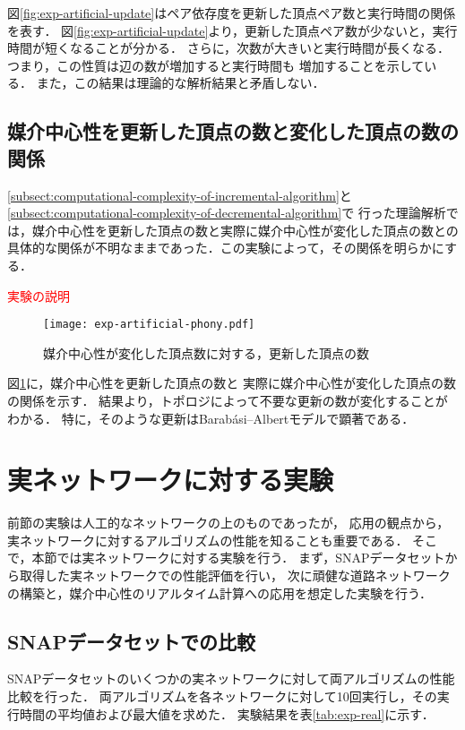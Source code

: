 図\ref{fig:exp-artificial-update}はペア依存度を更新した頂点ペア数と実行時間の関係を表す．
図\ref{fig:exp-artificial-update}より，更新した頂点ペア数が少ないと，実行時間が短くなることが分かる．
さらに，次数が大きいと実行時間が長くなる．つまり，この性質は辺の数が増加すると実行時間も
増加することを示している．
また，この結果は理論的な解析結果と矛盾しない．

\subsection{媒介中心性を更新した頂点の数と変化した頂点の数の関係}
\ref{subsect:computational-complexity-of-incremental-algorithm}と
\ref{subsect:computational-complexity-of-decremental-algorithm}で
行った理論解析では，媒介中心性を更新した頂点の数と実際に媒介中心性が変化した頂点の数との
具体的な関係が不明なままであった．この実験によって，その関係を明らかにする．

\textcolor{red}{実験の説明}

\begin{figure}[tb]
  \centering
  \texttt{[image: exp-artificial-phony.pdf]}
  \caption{媒介中心性が変化した頂点数に対する，更新した頂点の数}
  \label{fig:exp-artificial-phony}
\end{figure}

図\ref{fig:exp-artificial-phony}に，媒介中心性を更新した頂点の数と
実際に媒介中心性が変化した頂点の数の関係を示す．
結果より，トポロジによって不要な更新の数が変化することがわかる．
特に，そのような更新はBarab\'{a}si--Albertモデルで顕著である．

\section{実ネットワークに対する実験}
\label{sect:exp-realnet}
前節の実験は人工的なネットワークの上のものであったが，
応用の観点から，実ネットワークに対するアルゴリズムの性能を知ることも重要である．
そこで，本節では実ネットワークに対する実験を行う．
まず，SNAPデータセット\cite{Leskovec2016}から取得した実ネットワークでの性能評価を行い，
次に頑健な道路ネットワークの構築と，媒介中心性のリアルタイム計算への応用を想定した実験を行う．

\subsection{SNAPデータセットでの比較}
\label{subsect:exp-real}

SNAPデータセットのいくつかの実ネットワークに対して両アルゴリズムの性能比較を行った．
両アルゴリズムを各ネットワークに対して10回実行し，その実行時間の平均値および最大値を求めた．
実験結果を表\ref{tab:exp-real}に示す．

